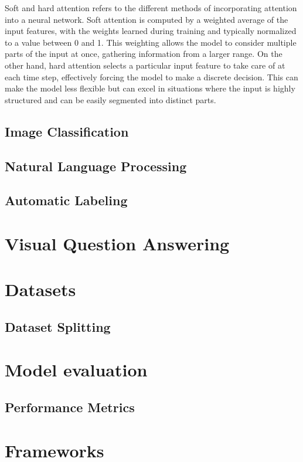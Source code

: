     Soft and hard attention refers to the different methods of incorporating attention into a neural network. Soft attention is computed by a weighted average of the input features, with the weights learned during training and typically normalized to a value between 0 and 1. This weighting allows the model to consider multiple parts of the input at once, gathering information from a larger range. On the other hand, hard attention selects a particular input feature to take care of at each time step, effectively forcing the model to make a discrete decision. This can make the model less flexible but can excel in situations where the input is highly structured and can be easily segmented into distinct parts.


    
    \subsection{Image Classification}


    \subsection{Natural Language Processing}
    \subsection{Automatic Labeling}



\section{Visual Question Answering}

    

   

\section{Datasets}


    

     

    \subsection{Dataset Splitting} 


\section{Model evaluation}

    \subsection{Performance Metrics}


\section{Frameworks}